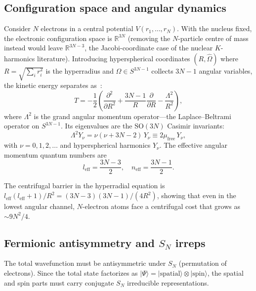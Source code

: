 \documentclass[aps,prl,twocolumn,superscriptaddress,longbibliography]{revtex4-2}
\newcommand{\mufree}{\mu_{\mathrm{free}}}
\newcommand{\neff}{n_{\mathrm{eff}}}
\newcommand{\leff}{l_{\mathrm{eff}}}
\begin{document}
\subsection{Configuration space and angular dynamics}
\label{sec:config}

Consider $N$ electrons in a central potential $V(r_1, \ldots, r_N)$.
With the nucleus fixed, the electronic configuration space is
$\mathbb{R}^{3N}$ (removing the $N$-particle centre of mass instead
would leave $\mathbb{R}^{3N-3}$, the Jacobi-coordinate case of the
nuclear $K$-harmonics literature).  Introducing hyperspherical coordinates
$(R, \hat{\Omega})$ where $R = \sqrt{\sum_i r_i^2}$ is the
hyperradius and $\hat{\Omega} \in S^{3N-1}$ collects $3N-1$ angular
variables, the kinetic energy separates as~\cite{Avery2000,
Fock1954}:
\begin{equation}
  T = -\frac{1}{2}\left(\frac{\partial^2}{\partial R^2}
    + \frac{3N-1}{R}\frac{\partial}{\partial R}
    - \frac{\Lambda^2}{R^2}\right),
  \label{eq:kinetic}
\end{equation}
where $\Lambda^2$ is the grand angular momentum operator---the
Laplace--Beltrami operator on $S^{3N-1}$.  Its eigenvalues are the
$\mathrm{SO}(3N)$ Casimir invariants:
\begin{equation}
  \Lambda^2 Y_\nu = \nu(\nu + 3N - 2)\, Y_\nu \equiv 2\mufree\, Y_\nu,
  \label{eq:casimir}
\end{equation}
with $\nu = 0, 1, 2, \ldots$ and hyperspherical harmonics $Y_\nu$.
The effective angular momentum quantum numbers are
\begin{equation}
  \leff = \frac{3N - 3}{2}, \quad \neff = \frac{3N - 1}{2}.
  \label{eq:eff_qn}
\end{equation}

The centrifugal barrier in the hyperradial equation is
$\leff(\leff + 1)/R^2 = (3N-3)(3N-1)/(4R^2)$, showing that even in
the lowest angular channel, $N$-electron atoms face a centrifugal cost
that grows as $\sim 9N^2/4$.

\subsection{Fermionic antisymmetry and $S_N$ irreps}
\label{sec:sn_irreps}

The total wavefunction must be antisymmetric under $S_N$ (permutation
of electrons).  Since the total state factorizes as $|\Psi\rangle =
|\text{spatial}\rangle \otimes |\text{spin}\rangle$, the spatial and
spin parts must carry conjugate $S_N$ irreducible representations.
\end{document}
